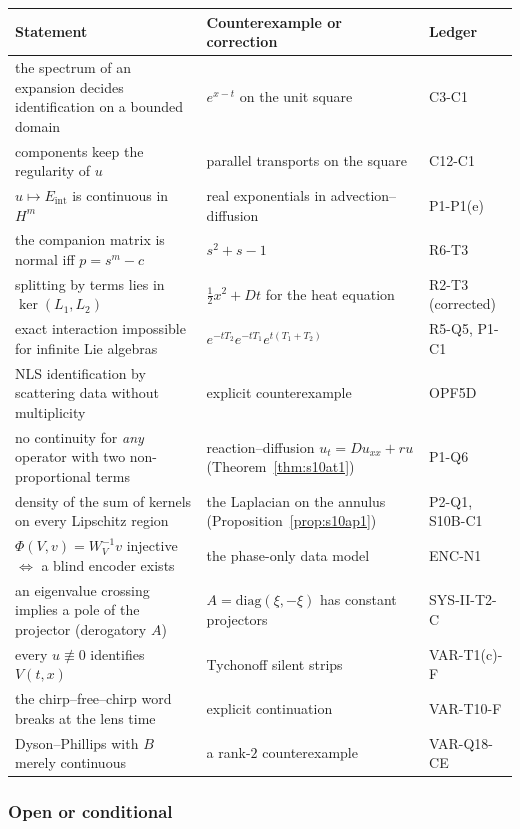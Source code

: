 \documentclass[11pt]{article}
\theoremstyle{plain}
\theoremstyle{definition}
\theoremstyle{remark}
\newcommand{\Eint}{E_{\mathrm{int}}}        %
\begin{document}
\begin{center}\small
\begin{tabular}{@{}L{5.2cm}L{6.0cm}L{2.6cm}@{}}
\toprule
Statement & Counterexample or correction & Ledger\\\midrule
the spectrum of an expansion decides identification on a bounded domain & $e^{x-t}$ on the unit square & C3-C1\\
components keep the regularity of $u$ & parallel transports on the square & C12-C1\\
$u\mapsto\Eint$ is continuous in $H^m$ & real exponentials in advection--diffusion & P1-P1(e)\\
the companion matrix is normal iff $p=s^m-c$ & $s^2+s-1$ & R6-T3\\
splitting by terms lies in $\ker(L_1,L_2)$ & $\tfrac12x^2+Dt$ for the heat equation & R2-T3 (corrected)\\
exact interaction impossible for infinite Lie algebras & $e^{-tT_2}e^{-tT_1}e^{t(T_1+T_2)}$ & R5-Q5, P1-C1\\
NLS identification by scattering data without multiplicity & explicit counterexample & OPF5D\\
no continuity for \emph{any} operator with two non-proportional terms & reaction--diffusion $u_t=Du_{xx}+ru$ (Theorem~\ref{thm:s10at1}) & P1-Q6\\
density of the sum of kernels on every Lipschitz region & the Laplacian on the annulus (Proposition~\ref{prop:s10ap1}) & P2-Q1, S10B-C1\\
$\Phi(V,v)=W_V^{-1}v$ injective $\iff$ a blind encoder exists & the phase-only data model & ENC-N1\\
an eigenvalue crossing implies a pole of the projector (derogatory $A$) & $A=\mathrm{diag}(\xi,-\xi)$ has constant projectors & SYS-II-T2-C\\
every $u\not\equiv0$ identifies $V(t,x)$ & Tychonoff silent strips & VAR-T1(c)-F\\
the chirp--free--chirp word breaks at the lens time & explicit continuation & VAR-T10-F\\
Dyson--Phillips with $B$ merely continuous & a rank-$2$ counterexample & VAR-Q18-CE\\\bottomrule
\end{tabular}
\end{center}

\subsubsection{Open or conditional}
\end{document}
